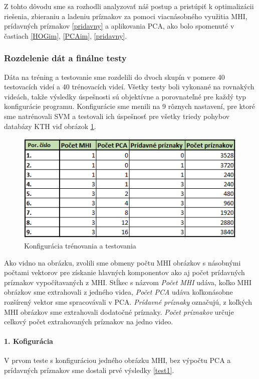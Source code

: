 Z tohto dôvodu sme sa rozhodli analyzovať náš postup a pristúpiť k optimalizácii riešenia, zbieraniu a ladeniu príznakov za pomoci viacnásobného využitia MHI, prídavných príznakov \ref{pridavny} a aplikovania PCA, ako bolo spomenuté v častiach \ref{HOGim}, \ref{PCAim}, \ref{pridavny}.


\subsubsection{Rozdelenie dát a finálne testy}
Dáta na tréning a testovanie sme rozdelili do dvoch skupín v pomere 40 testovacích videí a 40 trénovacích videí. Všetky testy boli vykonané na rovnakých videách, takže výsledky úspešnosti sú objektívne a porovnateľné pre každý typ konfigurácie programu.
Konfigurácie sme menili na 9 rôznych nastavení, pre ktoré sme natrénovali SVM a testovali ich úspešnosť pre všetky triedy pohybov databázy KTH viď obrázok \ref{tabTesty}.

\begin{figure}[H]
  \centering
  \includegraphics[width=14cm]{img/tabTesty.png}
  \caption{Konfigurácia trénovania a testovania}
  \label{tabTesty}
\end{figure} 

Ako vidno na obrázku, zvolili sme obmeny počtu MHI obrázkov s násobnými počtami vektorov pre získanie hlavných komponentov ako aj počet prídavných príznakov vypočítavaných z MHI. Stĺkec s názvom \textit{Počet MHI} udáva, koľko MHI obrázkov sme extrahovali z jedného videa, \textit{Počet PCA} udáva koľkonásobne rozšírený vektor sme spracovávali v PCA. \textit{Prídavné príznaky} označujú, z koľkých MHI obrázkov sme extrahovali dodatočné príznaky. \textit{Počet príznakov} určuje celkový počet extrahovaných príznakov na jedno video. 

\paragraph{1. Kofigurácia} 
V prvom teste s konfiguráciou jedného obrázku MHI, bez výpočtu PCA a prídavných príznakov sme dostali prvé výsledky \ref{test1}.

